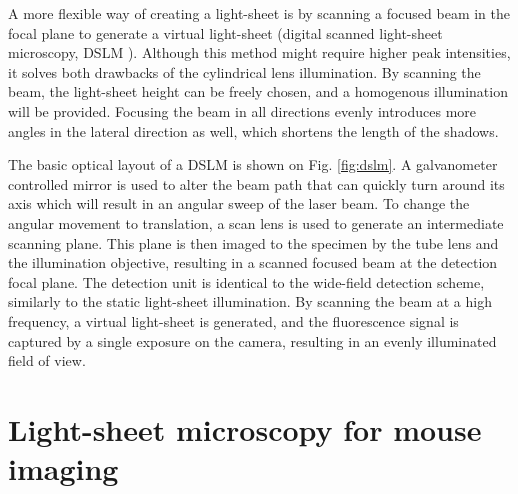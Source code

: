     A more flexible way of creating a light-sheet is by scanning a focused beam in the focal plane to generate a virtual light-sheet (digital scanned light-sheet microscopy, DSLM \cite{keller_reconstruction_2008}). Although this method might require higher peak intensities, it solves both drawbacks of the cylindrical lens illumination. By scanning the beam, the light-sheet height can be freely chosen, and a homogenous illumination will be provided. Focusing the beam in all directions evenly introduces more angles in the lateral direction as well, which shortens the length of the shadows.
    
    The basic optical layout of a DSLM is shown on Fig. \ref{fig:dslm}. A galvanometer controlled mirror is used to alter the beam path that can quickly turn around its axis which will result in an angular sweep of the laser beam. To change the angular movement to translation, a scan lens is used to generate an intermediate scanning plane. This plane is then imaged to the specimen by the tube lens and the illumination objective, resulting in a scanned focused beam at the detection focal plane. The detection unit is identical to the wide-field detection scheme, similarly to the static light-sheet illumination. By scanning the beam at a high frequency, a virtual light-sheet is generated, and the fluorescence signal is captured by a single exposure on the camera, resulting in an evenly illuminated field of view.

  



  



\section{Light-sheet microscopy for mouse imaging}

